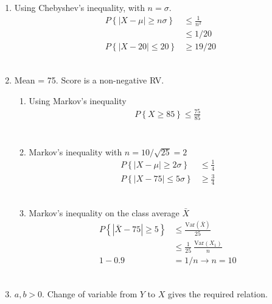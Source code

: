 \begin{enumerate}
	
	\item Using Chebyshev's inequality, with $ n = \sigma $.\\
	
		\begin{align}
			P\left\{\left| X - \mu \right| \geq n\sigma \right\} &\leq \frac{1}{n^2} \nonumber \\
			& \leq 1/20 \nonumber \\
			P\left\{\left| X - 20 \right| \leq 20 \right\} &\geq 19/20
		\end{align} \\
	
	
	\item Mean = 75. Score is a non-negative RV. \\
	
		\begin{enumerate}
			
			\item Using Markov's inequality\\
			\begin{align}
				P \left\{X \geq 85 \right\} \leq \frac{75}{85} \\
			\end{align} \\
			
			\item Markov's inequality with $ n = 10/\sqrt{25} = 2 $\\
			\begin{align}
				P\left\{\left| X - \mu \right| \geq 2 \sigma \right\} &\leq \frac{1}{4} \nonumber \\
				P\left\{\left| X - 75 \right| \leq 5 \sigma \right\} & \geq \frac{3}{4}
			\end{align} \\
			
			\item Markov's inequality on the class average $ \bar{X} $ \\
			\begin{align}
				P\left\{\left| \bar{X} - 75 \right| \geq 5 \right\} &\leq \frac{\mathrm{Var}(\bar{X})}{25} \nonumber \\
				& \leq \frac{1}{25}\ \frac{\mathrm{Var}(X_1)}{n} \\
				1 - 0.9 &= 1/n \to n = 10
			\end{align} \\
		\end{enumerate}
	
	
	\item $ a, b > 0 $. Change of variable from $ Y $ to $ X $ gives the required relation.\\
	

\end{enumerate}
